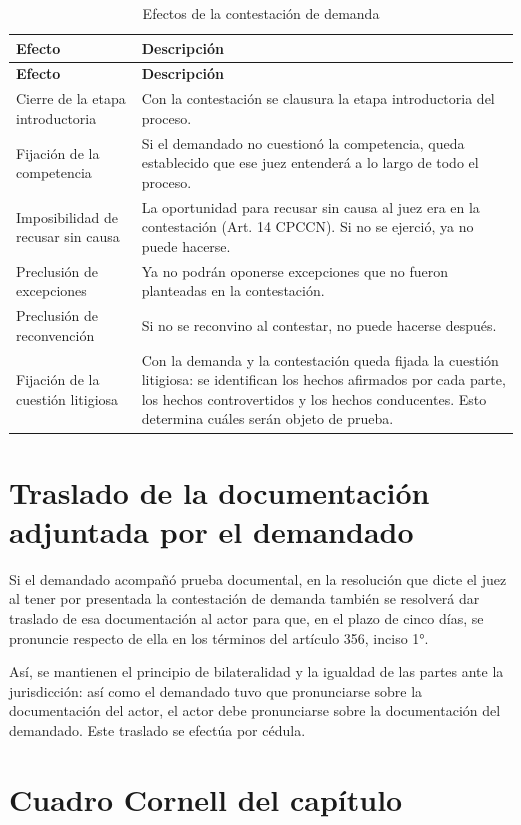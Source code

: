 \documentclass[12pt,oneside]{book}
\begin{document}
\begin{longtable}{p{} p{}}
\caption{Efectos de la contestación de demanda} \\
\toprule
\textbf{Efecto} & \textbf{Descripción} \\
\midrule
\endfirsthead
\toprule
\textbf{Efecto} & \textbf{Descripción} \\
\midrule
\endhead
Cierre de la etapa introductoria & Con la contestación se clausura la etapa introductoria del proceso. \\
Fijación de la competencia & Si el demandado no cuestionó la competencia, queda establecido que ese juez entenderá a lo largo de todo el proceso. \\
Imposibilidad de recusar sin causa & La oportunidad para recusar sin causa al juez era en la contestación (Art. 14 CPCCN). Si no se ejerció, ya no puede hacerse. \\
Preclusión de excepciones & Ya no podrán oponerse excepciones que no fueron planteadas en la contestación. \\
Preclusión de reconvención & Si no se reconvino al contestar, no puede hacerse después. \\
Fijación de la cuestión litigiosa & Con la demanda y la contestación queda fijada la cuestión litigiosa: se identifican los hechos afirmados por cada parte, los hechos controvertidos y los hechos conducentes. Esto determina cuáles serán objeto de prueba. \\
\bottomrule
\end{longtable}

\section{Traslado de la documentación adjuntada por el demandado}

Si el demandado acompañó prueba documental, en la resolución que dicte el juez al tener por presentada la contestación de demanda también se resolverá dar traslado de esa documentación al actor para que, en el plazo de cinco días, se pronuncie respecto de ella en los términos del artículo 356, inciso 1°.

Así, se mantienen el principio de bilateralidad y la igualdad de las partes ante la jurisdicción: así como el demandado tuvo que pronunciarse sobre la documentación del actor, el actor debe pronunciarse sobre la documentación del demandado. Este traslado se efectúa por cédula.

\section*{Cuadro Cornell del capítulo}
\end{document}
